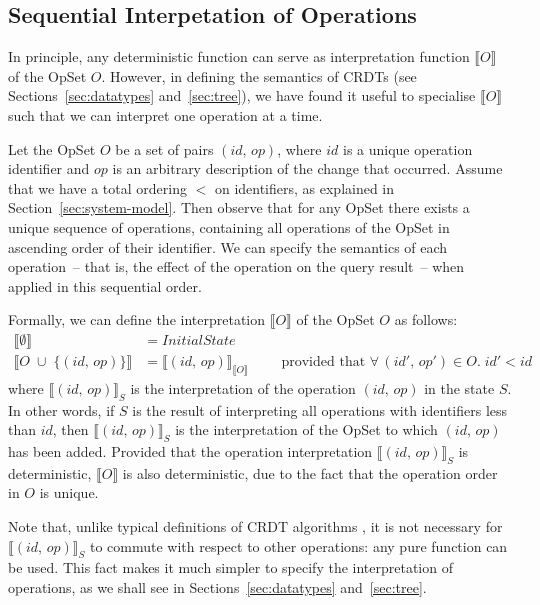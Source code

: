 \subsection{Sequential Interpetation of Operations}\label{sec:op-serial}

In principle, any deterministic function can serve as interpretation function $\llbracket O \rrbracket$ of the OpSet $O$.
However, in defining the semantics of CRDTs (see Sections~\ref{sec:datatypes} and~\ref{sec:tree}), we have found it useful to specialise $\llbracket O \rrbracket$ such that we can interpret one operation at a time.

Let the OpSet $O$ be a set of pairs $(\mathit{id},\, \mathit{op})$, where $\mathit{id}$ is a unique operation identifier and $\mathit{op}$ is an arbitrary description of the change that occurred.
Assume that we have a total ordering $<$ on identifiers, as explained in Section~\ref{sec:system-model}.
Then observe that for any OpSet there exists a unique sequence of operations, containing all operations of the OpSet in ascending order of their identifier.
We can specify the semantics of each operation~-- that is, the effect of the operation on the query result~-- when applied in this sequential order.

Formally, we can define the interpretation $\llbracket O \rrbracket$ of the OpSet $O$ as follows:
\begin{align*}
    \big\llbracket \emptyset \big\rrbracket &= \mathit{InitialState} \\
    \big\llbracket O \;\cup\; \{(\mathit{id},\, \mathit{op})\} \big\rrbracket &=
    \big\llbracket (\mathit{id},\, \mathit{op}) \big\rrbracket_{\llbracket O \rrbracket}
    \qquad\text{ provided that } \forall\,(\mathit{id}',\, \mathit{op}') \in O.\; \mathit{id}' < \mathit{id}
\end{align*}
where $\llbracket (\mathit{id},\, \mathit{op}) \rrbracket_S$ is the interpretation of the operation $(\mathit{id},\, \mathit{op})$ in the state $S$.
In other words, if $S$ is the result of interpreting all operations with identifiers less than $\mathit{id}$, then
$\llbracket (\mathit{id},\, \mathit{op}) \rrbracket_S$ is the interpretation of the OpSet to which $(\mathit{id},\, \mathit{op})$ has been added.
Provided that the operation interpretation $\llbracket (\mathit{id},\, \mathit{op}) \rrbracket_S$ is deterministic, $\llbracket O \rrbracket$ is also deterministic, due to the fact that the operation order in $O$ is unique.

Note that, unlike typical definitions of CRDT algorithms \cite{Shapiro:2011wy,Shapiro:2011un}, it is not necessary for $\llbracket (\mathit{id},\, \mathit{op}) \rrbracket_S$ to commute with respect to other operations: any pure function can be used.
This fact makes it much simpler to specify the interpretation of operations, as we shall see in Sections~\ref{sec:datatypes} and~\ref{sec:tree}.

